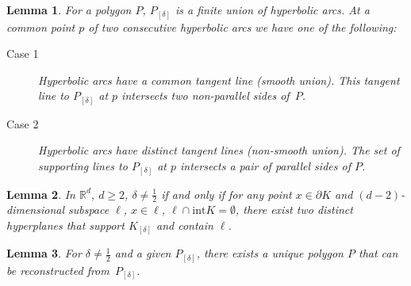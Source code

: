 \documentclass[10pt,a4paper]{amsart}
\newtheorem{lemma}{Lemma}
\begin{document}
\begin{lemma}\label{P_Dupin}
For a polygon $P$, $P_{[\delta]}$ is a finite union of hyperbolic arcs. At a common point $p$ of two consecutive hyperbolic arcs we have one of the following:
\begin{description}
    \item[Case 1] Hyperbolic arcs have a common tangent line (smooth union). This tangent line to $P_{[\delta]}$ at $p$ intersects two non-parallel sides of~$P$.
    \item[Case 2] Hyperbolic arcs have distinct tangent lines (non-smooth union). The set of supporting lines to $P_{[\delta]}$ at $p$ intersects a pair of parallel sides of $P$. 
\end{description}
\end{lemma}

\begin{lemma}\label{Sus}
    In $\mathbb{R}^d$, $d \geq 2$, $\delta \neq \frac{1}{2}$ if and only if for any point $x \in \partial K$ and $(d-2)$-dimensional subspace $\ell$, $x \in \ell$, $\ell \cap \text{int}K = \emptyset$, there exist two distinct hyperplanes that support $K_{[\delta]}$ and contain $\ell$.
\end{lemma} 

\begin{lemma}
    For $\delta \neq \frac{1}{2}$ and a given $P_{[\delta]}$, there exists a unique polygon $P$ that can be reconstructed from~$P_{[\delta]}$.
\end{lemma}
\end{document}
